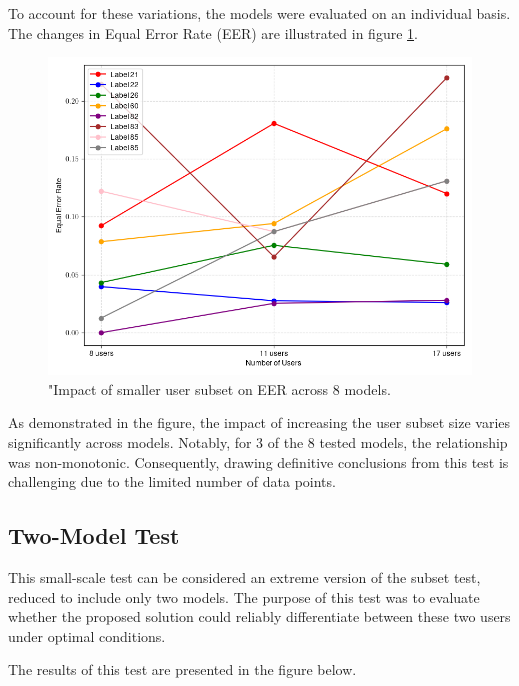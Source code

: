 To account for these variations, the models were evaluated on an individual basis. The changes in Equal Error Rate (EER) are illustrated in figure \ref{fig:subset_plot}.

\begin{figure}[H]
	\centering
	\includegraphics[width=.7\textwidth]{images/subset_test_res.png}
	\caption{"Impact of smaller user subset on EER across 8 models.}
	\label{fig:subset_plot}
\end{figure}

As demonstrated in the figure, the impact of increasing the user subset size varies significantly across models. Notably, for 3 of the 8 tested models, the relationship was non-monotonic. Consequently, drawing definitive conclusions from this test is challenging due to the limited number of data points.

\subsection{Two-Model Test}
This small-scale test can be considered an extreme version of the subset test, reduced to include only two models. The purpose of this test was to evaluate whether the proposed solution could reliably differentiate between these two users under optimal conditions.

The results of this test are presented in the figure below.

